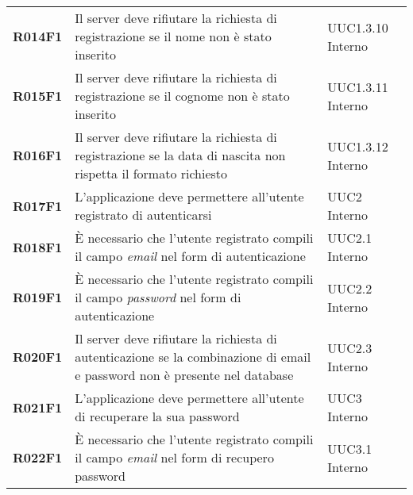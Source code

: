 \documentclass[../analisi-dei-requisiti.tex]{subfiles}
\begin{document}
\begin{longtable}[H]{>{\centering\bfseries}m{3cm} >{\centering}m{10cm} >{\centering\arraybackslash}m{3cm}}
  R014F1                               & Il server deve rifiutare la richiesta di registrazione se il nome non è stato inserito                                                                                                                  & UUC1.3.10 Interno             \\
  R015F1                               & Il server deve rifiutare la richiesta di registrazione se il cognome non è stato inserito                                                                                                               & UUC1.3.11 Interno             \\
  R016F1                               & Il server deve rifiutare la richiesta di registrazione se la data di nascita non rispetta il formato richiesto                                                                                          & UUC1.3.12 Interno             \\
  R017F1                               & L'applicazione deve permettere all'utente registrato di autenticarsi                                                                                                                                    & UUC2 Interno                  \\
  R018F1                               & È necessario che l'utente registrato compili il campo \textit{email} nel form di autenticazione                                                                                                         & UUC2.1 Interno                \\
  R019F1                               & È necessario che l'utente registrato compili il campo \textit{password} nel form di autenticazione                                                                                                      & UUC2.2 Interno                \\
  R020F1                               & Il server deve rifiutare la richiesta di autenticazione se la combinazione di email e password non è presente nel database                                                                              & UUC2.3 Interno                \\
  R021F1                               & L'applicazione deve permettere all'utente di recuperare la sua password                                                                                                                                 & UUC3 Interno                  \\
  R022F1                               & È necessario che l'utente registrato compili il campo \textit{email} nel form di recupero password                                                                                                      & UUC3.1 Interno                \\

\end{longtable}
\end{document}
